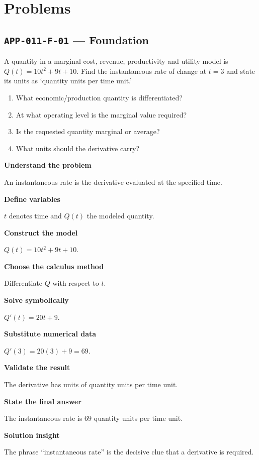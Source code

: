 \documentclass[11pt]{book}
\newcommand{\pid}[1]{\texttt{#1}}
\begin{document}
\section*{Problems}
\subsection*{\pid{APP-011-F-01} — Foundation}
\begin{problembox}
A quantity in a marginal cost, revenue, productivity and utility model is $Q(t)=10t^2+9t+10$. Find the instantaneous rate of change at $t=3$ and state its units as ‘quantity units per time unit.’
\end{problembox}
\begin{promptbox}\begin{enumerate}
\item What economic/production quantity is differentiated?
\item At what operating level is the marginal value required?
\item Is the requested quantity marginal or average?
\item What units should the derivative carry?
\end{enumerate}\end{promptbox}
\begin{solutionbox}
\textbf{Understand the problem}\par An instantaneous rate is the derivative evaluated at the specified time.\par\medskip
\textbf{Define variables}\par $t$ denotes time and $Q(t)$ the modeled quantity.\par\medskip
\textbf{Construct the model}\par $Q(t)=10t^2+9t+10$.\par\medskip
\textbf{Choose the calculus method}\par Differentiate $Q$ with respect to $t$.\par\medskip
\textbf{Solve symbolically}\par $Q'(t)=20t+9$.\par\medskip
\textbf{Substitute numerical data}\par $Q'(3)=20(3)+9=69$.\par\medskip
\textbf{Validate the result}\par The derivative has units of quantity units per time unit.\par\medskip
\textbf{State the final answer}\par The instantaneous rate is $69$ quantity units per time unit.\par\medskip
\textbf{Solution insight}\par The phrase “instantaneous rate” is the decisive clue that a derivative is required.\par\medskip
\end{solutionbox}
\end{document}

